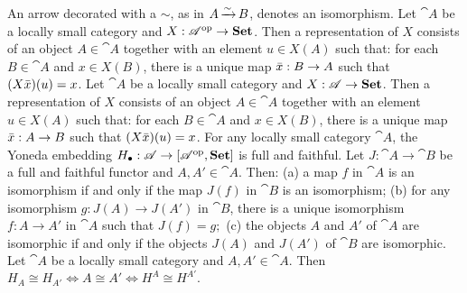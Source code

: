  An arrow decorated with a $\sim$, as in $A \operatorname{\xrightarrow[]{\sim}} B$, denotes an isomorphism.
 Let $\cat A$ be a locally small category and $X: \mathscr{A}^{\operatorname{op}} \to \operatorname{\mathbf{Set}}$. Then a representation of $X$ consists of an object $A \in \cat A$ together with an element $u \in X(A)$ such that: 
for each $B \in \cat{A}$ and $x \in X(B)$, there is a unique map $\Bar{x}: B \to A$ such that $(X\Bar{x})(u) = x$.
 Let $\cat A$ be a locally small category and $X: \mathscr{A} \to \operatorname{\mathbf{Set}}$. Then a representation of $X$ consists of an object $A \in \cat A$ together with an element $u \in X(A)$ such that: 
for each $B \in \cat{A}$ and $x \in X(B)$, there is a unique map $\Bar{x}: A \to B$ such that $(X\Bar{x})(u) = x$.
 For any locally small category $\cat A$, the Yoneda embedding 
$H_\bullet : \mathscr{A} \to [\mathscr{A}^{\operatorname{op}}, \operatorname{\mathbf{Set}}]$ 
is full and faithful.
 Let $J: \cat A \to \cat B$ be a full and faithful functor and $A, A' \in \cat A$. Then:
(a) a map $f$ in $\cat A$ is an isomorphism if and only if the map $J(f)$ in $\cat B$ is an isomorphism;
(b) for any isomorphism $g: J(A) \to J(A')$ in $\cat B$, there is a unique isomorphism $f: A \to A'$ in $\cat A$ such that $J(f) = g;$ 
(c) the objects $A$ and $A'$ of $\cat A$ are isomorphic if and only if the objects $J(A)$ and $J(A')$ of $\cat B$ are isomorphic.
 Let $\cat A$ be a locally small category and $A, A' \in \cat A$. Then
$H_A \cong H_{A'} \iff A \cong A' \iff H^A \cong H^{A'}.$